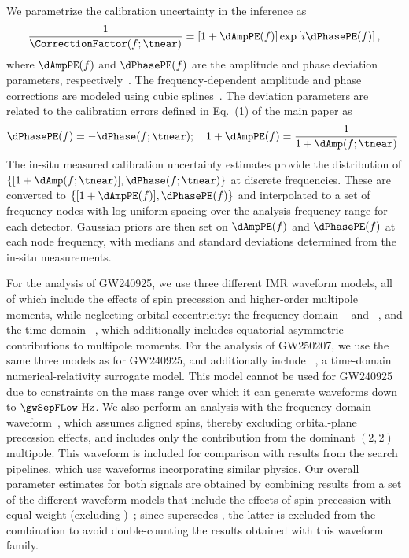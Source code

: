 We parametrize the calibration uncertainty in the inference as
\begin{align}
   \frac{1}{\CorrectionFactor(f;\tnear)} = \left[1 + \dAmpPE(f)\right]\exp\left[i\dPhasePE(f)\right],
\end{align}
where $\dAmpPE(f)$ and $\dPhasePE(f)$ are the amplitude and phase deviation parameters, respectively~\cite{Baka:2025aaa}.
The frequency-dependent amplitude and phase corrections are modeled using cubic splines~\cite{Farr:2014aab,TheLIGOScientific:2016wfe,LIGOScientific:2025yae}.
The deviation parameters are related to the calibration errors defined in Eq.~(1) of the main paper as
\begin{align}
	\dPhasePE(f) = -\dPhase(f;\tnear);\quad 1 + \dAmpPE(f) = \frac{1}{1 + \dAmp(f;\tnear)}.
\end{align}
The in-situ measured calibration uncertainty estimates provide the distribution of $\{[1 + \dAmp(f;\tnear)], \dPhase(f;\tnear)\}$ at discrete frequencies.
These are converted to $\{[1 + \dAmpPE(f)], \dPhasePE(f)\}$ and interpolated to a set of \PENumSpline{} frequency nodes with log-uniform spacing over the analysis frequency range for each detector.
Gaussian priors are then set on $\dAmpPE(f)$ and $\dPhasePE(f)$ at each node frequency, with medians and standard deviations determined from the in-situ measurements.

For the analysis of \ac{GW240925}, we use three different \ac{IMR} waveform models, all of which include the effects of spin precession and higher-order multipole moments, while neglecting orbital eccentricity: the frequency-domain \IMRPhenomXPHM{}~\cite{Pratten:2020ceb,Colleoni:2024knd} and \IMRPhenomXPNR{}~\cite{Hamilton:2021pkf,Hamilton:2025xru}, and the time-domain \SEOBNRFIVEPHM{}~\cite{Ramos-Buades:2023ehm,Estelles:2025zah}, which additionally includes equatorial asymmetric contributions to multipole moments.
For the analysis of \ac{GW250207}, we use the same three models as for \ac{GW240925}, and additionally include \SURSEVENDQFOUR{}~\cite{Varma:2018mmi}, a time-domain numerical-relativity surrogate model.
This model cannot be used for \ac{GW240925} due to constraints on the mass range over which it can generate waveforms down to $\gwSepFLow~\mathrm{Hz}$.
We also perform an analysis with the frequency-domain \IMRPhenomXAS{} waveform~\cite{Pratten:2020fqn}, which assumes aligned spins, thereby excluding orbital-plane precession effects, and includes only the contribution from the dominant $(2,2)$ multipole.
This waveform is included for comparison with results from the search pipelines, which use waveforms incorporating similar physics.
Our overall parameter estimates for both signals are obtained by combining results from a set of the different waveform models that include the effects of spin precession with equal weight (excluding \IMRPhenomXAS{})~\cite{TheLIGOScientific:2016wfe,LIGOScientific:2025yae}; since \IMRPhenomXPNR{} supersedes \IMRPhenomXPHM{}, the latter is excluded from the combination to avoid double-counting the results obtained with this waveform family.

